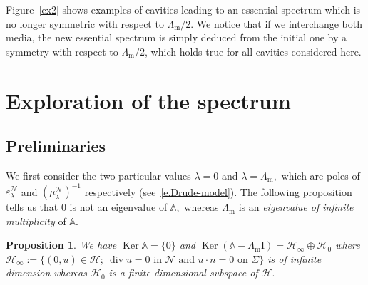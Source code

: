 \documentclass[11pt]{article}
\newtheorem{prop}[theo]{Proposition}
\theoremstyle{definition}
\numberwithin{equation}{section}
\numberwithin{figure}{section}
\numberwithin{table}{section}
\DeclareMathOperator{\Div}{div}
\DeclareMathOperator{\Ker}{Ker}
\newcommand{\epsl}{\varepsilon}
\newcommand{\calH}{\mathcal{H}}
\newcommand{\calN}{\mathcal{N}}
\newcommand{\bbA}{\mathbb{A}}
\newcommand{\Ident}{{\mathrm{I}}}
\newcommand{\Lm}{{\Lambda_{\mathrm{m}}}}
\begin{document}
Figure~\ref{ex2} shows examples of cavities leading to an essential spectrum which is no longer symmetric with respect to $\Lm/2$. We notice that if we interchange both media, the new essential spectrum is simply deduced from the initial one by a symmetry with respect to $\Lm/2$, which holds true for all cavities considered here.


\section{Exploration of the spectrum}\label{s-investigation}

\subsection{Preliminaries}\label{s-prelimin}

We first consider the two particular values $\lambda = 0$ and $\lambda = \Lm,$ which are poles of $\epsl_\lambda^\calN$ and $(\mu_\lambda^\calN)^{-1}$ respectively (see~\eqref{e.Drude-model}). The following proposition tells us that $0$ is not an eigenvalue of $\bbA,$ whereas $\Lm$ is an \emph{eigenvalue of infinite multiplicity} of $\bbA.$

\begin{prop}\label{p.partic-values}
We have $\Ker \bbA = \{0\}$ and $\Ker(\bbA - \Lm\Ident) = \calH_\infty \oplus \calH_0$ where $\calH_\infty := \big\{(0,u) \in \calH;\ \Div u = 0 \text{ in }\calN \text{ and } u \cdot n = 0 \text{ on }\Sigma \big\}$ is of infinite dimension whereas $\calH_0$ is a finite dimensional subspace of $\calH.$
\end{prop}
\end{document}
